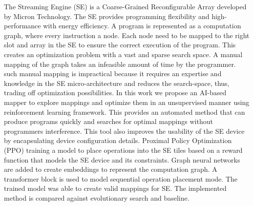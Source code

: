 The Streaming Engine (SE) is a Coarse-Grained Reconfigurable Array developed by Micron 
Technology.
The SE provides programming flexibility and high-performance with energy efficiency.
A program is represented as a computation graph, where every instruction a node.
Each node need to be mapped to the right slot and array in the SE to ensure the correct execution of the program.
This creates an optimization problem with a vast and sparse search space.
A manual mapping of the graph takes an infeasible amount of time by the programmer.
such manual mapping is impractical because it requires an expertise and knowledge in the SE micro-architecture and reduces the search-space, thus, trading off optimization possibilities.
In this work we propose an AI-based mapper to explore mappings and optimize them in an unsupervised manner using reinforcement learning framework.
This provides an automated method that can produce programs quickly and searches for optimal mappings without programmers interference. 
This tool also improves the usability of the SE device by encapsulating device configuration details.
Proximal Policy Optimization (PPO) training a model to place operations into the SE tiles based on a reward function that models the SE device and its constraints.
Graph neural networks are added to create embeddings to represent the computation graph.
A transformer block is used to model sequential operation placement mode. 
The trained model was able to create valid mappings for SE.
The implemented method is compared against evolutionary search and baseline.